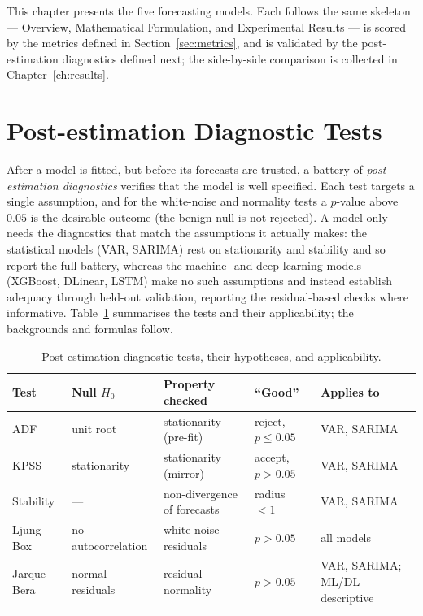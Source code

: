 \documentclass[12pt,a4paper,oneside]{report}
\begin{document}
This chapter presents the five forecasting models. Each follows the same skeleton ---
Overview, Mathematical Formulation, and Experimental Results --- is scored by the
metrics defined in Section~\ref{sec:metrics}, and is validated by the post-estimation
diagnostics defined next; the side-by-side comparison is collected in
Chapter~\ref{ch:results}.

\section{Post-estimation Diagnostic Tests}
\label{sec:diagnostics}
After a model is fitted, but before its forecasts are trusted, a battery of
\emph{post-estimation diagnostics} verifies that the model is well specified. Each
test targets a single assumption, and for the white-noise and normality tests a
$p$-value above $0.05$ is the desirable outcome (the benign null is not rejected). A
model only needs the diagnostics that match the assumptions it actually makes: the
statistical models (VAR, SARIMA) rest on stationarity and stability and so report the
full battery, whereas the machine- and deep-learning models (XGBoost, DLinear, LSTM)
make no such assumptions and instead establish adequacy through held-out validation,
reporting the residual-based checks where informative. Table~\ref{tab:diag-tests}
summarises the tests and their applicability; the backgrounds and formulas follow.

\begin{table}[H]
\centering
\caption{Post-estimation diagnostic tests, their hypotheses, and applicability.}
\label{tab:diag-tests}
\renewcommand{\arraystretch}{1.2}
\begin{tabularx}{\textwidth}{%
  l
  >{\raggedright\arraybackslash}X
  >{\raggedright\arraybackslash}X
  >{\raggedright\arraybackslash}p{2.1cm}
  >{\raggedright\arraybackslash}X}
\toprule
\textbf{Test} & \textbf{Null $H_0$} & \textbf{Property checked} & \textbf{``Good''} & \textbf{Applies to} \\
\midrule
ADF          & unit root          & stationarity (pre-fit)      & reject, $p\le0.05$ & VAR, SARIMA \\
KPSS         & stationarity       & stationarity (mirror)       & accept, $p>0.05$   & VAR, SARIMA \\
Stability    & ---                & non-divergence of forecasts & radius $<1$         & VAR, SARIMA \\
Ljung--Box   & no autocorrelation & white-noise residuals       & $p>0.05$           & all models \\
Jarque--Bera & normal residuals   & residual normality          & $p>0.05$           & VAR, SARIMA; ML/DL descriptive \\
\bottomrule
\end{tabularx}
\renewcommand{\arraystretch}{1}
\end{table}
\end{document}
